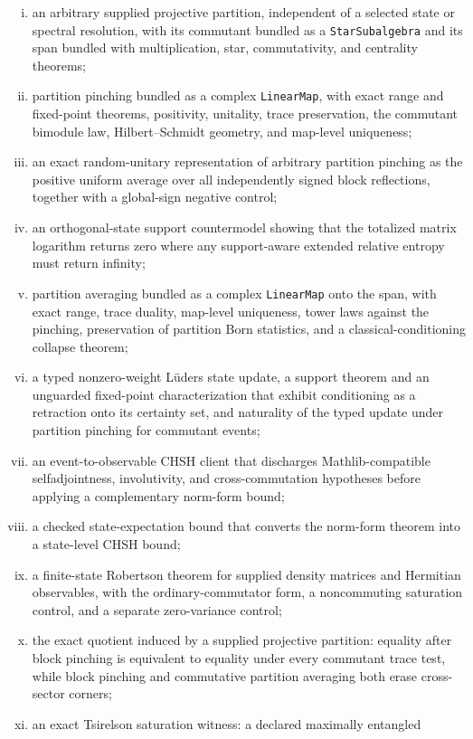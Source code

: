 \documentclass[11pt]{article}
\renewcommand{\_}{\textunderscore\allowbreak}
\theoremstyle{remark}
\begin{document}
\begin{enumerate}[(i)]
\item an arbitrary supplied projective partition, independent of a selected
state or spectral resolution, with its commutant bundled as a
\texttt{StarSubalgebra} and its span bundled with multiplication, star,
commutativity, and centrality theorems;
\item partition pinching bundled as a complex \texttt{LinearMap}, with exact
range and fixed-point theorems, positivity, unitality, trace preservation, the
commutant bimodule law, Hilbert--Schmidt geometry, and map-level uniqueness;
\item an exact random-unitary representation of arbitrary partition pinching
as the positive uniform average over all independently signed block
reflections, together with a global-sign negative control;
\item an orthogonal-state support countermodel showing that the totalized
matrix logarithm returns zero where any support-aware extended relative
entropy must return infinity;
\item partition averaging bundled as a complex \texttt{LinearMap} onto the
span, with exact range, trace duality, map-level uniqueness, tower laws
against the pinching, preservation of partition Born statistics, and a
classical-conditioning collapse theorem;
\item a typed nonzero-weight L\"uders state update, a support theorem and an
unguarded fixed-point characterization that exhibit conditioning as a
retraction onto its certainty set, and naturality of the typed update under
partition pinching for commutant events;
\item an event-to-observable CHSH client that discharges Mathlib-compatible
selfadjointness, involutivity, and cross-commutation hypotheses before
applying a complementary norm-form bound;
\item a checked state-expectation bound that converts the norm-form theorem
into a state-level CHSH bound;
\item a finite-state Robertson theorem for supplied density matrices and
Hermitian observables, with the ordinary-commutator form, a noncommuting
saturation control, and a separate zero-variance control;
\item the exact quotient induced by a supplied projective partition: equality
after block pinching is equivalent to equality under every commutant trace
test, while block pinching and commutative partition averaging both erase
cross-sector corners;
\item an exact Tsirelson saturation witness: a declared maximally entangled

\end{enumerate}
\end{document}
